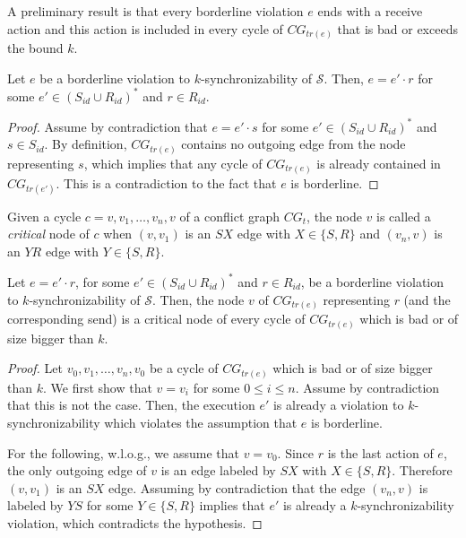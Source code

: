 
A preliminary result is that every borderline violation $e$ ends with a receive action and this action is included in every cycle of $CG_{tr(e)}$ that is 
bad or exceeds the bound $k$. 

\begin{lemma}
Let $e$ be a borderline violation to $k$-synchronizability of $\mathcal{S}$. Then, $e = e'\cdot r$ for some $e'\in (S_{id}\cup R_{id})^*$ and $r\in R_{id}$.
\end{lemma}
\begin{proof}
Assume by contradiction that $e=e'\cdot s$ for some $e'\in (S_{id}\cup R_{id})^*$ and $s\in S_{id}$. By definition, $CG_{tr(e)}$ contains no outgoing
edge from the node representing $s$, which implies that any cycle of $CG_{tr(e)}$ is already contained in $CG_{tr(e')}$. This is a contradiction to 
the fact that $e$ is borderline.
\end{proof}

Given a cycle $c = v,v_1,\ldots,v_n,v$ of a conflict graph $CG_t$, the node $v$ is called a \emph{critical} node of $c$ when $(v,v_1)$ is an $SX$ edge with $X\in \{S,R\}$ 
and $(v_n,v)$ is an $YR$ edge with $Y\in \{S,R\}$.

\begin{lemma}
Let $e = e'\cdot r$, for some $e'\in (S_{id}\cup R_{id})^*$ and $r\in R_{id}$, be a borderline violation to $k$-synchronizability of $\mathcal{S}$. 
Then, the node $v$ of $CG_{tr(e)}$ representing $r$ (and the corresponding send) is a critical node of every cycle of 
$CG_{tr(e)}$ which is bad or of size bigger than $k$. %
\end{lemma}
\begin{proof}
Let $v_0,v_1,\ldots,v_n,v_0$ be a cycle of $CG_{tr(e)}$ which is bad or of size bigger than $k$. We first show that $v=v_i$ for some $0\leq i\leq n$. 
Assume by contradiction that this is not the case. Then, the execution $e'$ is already a violation to $k$-synchronizability which violates the assumption that $e$ is borderline.

For the following, w.l.o.g., we assume that $v=v_0$. Since $r$ is the last action of $e$, the only outgoing edge of $v$ is an edge labeled by $SX$ with $X\in \{S,R\}$. Therefore $(v,v_1)$ is an $SX$ edge. 
Assuming by contradiction that the edge $(v_n,v)$ is labeled by $YS$ for some $Y\in \{S,R\}$ implies that $e'$ is already a $k$-synchronizability violation, which contradicts the hypothesis.
\end{proof}



